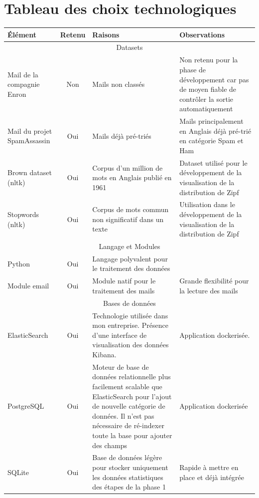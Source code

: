 \documentclass[a4paper,12pt]{article}
\begin{document}
\section{Tableau des choix technologiques}
	\begin{tabular}{|p{3cm}|c|p{4cm}|p{6cm}|}
		\hline
		Élément & Retenu & Raisons & Observations \\
		\hline
		
		\multicolumn{4}{|c|}{Datasets} \\
		\hline
		Mail de la compagnie Enron & Non & Mails non classés & Non retenu pour la phase de développement car pas de moyen fiable de contrôler la sortie automatiquement \\
		\hline
		Mail du projet SpamAssassin & Oui & Mails déjà pré-triés & Mails principalement en Anglais déjà pré-trié en catégorie Spam et Ham \\
		\hline
		Brown dataset (nltk) & Oui & Corpus d'un million de mots en Anglais publié en 1961 & Dataset utilisé pour le développement de la visualisation de la distribution de Zipf\\
		\hline
		Stopwords (nltk) & Oui & Corpus de mots commun non significatif dans un texte & Utilisation dans le développement de la visualisation de la distribution de Zipf\\
		\hline
		
		\multicolumn{4}{|c|}{Langage et Modules} \\
		\hline
		Python & Oui & Langage polyvalent pour le traitement des données & \\		
		\hline
		Module email & Oui & Module natif pour le traitement des mails & Grande flexibilité pour la lecture des mails \\
		\hline
				
		\multicolumn{4}{|c|}{Bases de données} \\
		\hline
		ElasticSearch & Oui & Technologie utilisée dans mon entreprise. Présence d'une interface de visualisation des données Kibana. & Application dockerisée. \\
		\hline
		PostgreSQL & Oui & Moteur de base de données relationnelle plus facilement scalable que ElasticSearch pour l'ajout de nouvelle catégorie de données. Il n'est pas nécessaire de ré-indexer toute la base pour ajouter des champs & Application dockerisée\\
		\hline
		SQLite & Oui & Base de données légère pour stocker uniquement les données statistiques des étapes de la phase 1 & Rapide à mettre en place et déjà intégrée \\
		\hline		
		
		\hline
	\end{tabular}
	
\end{document}
